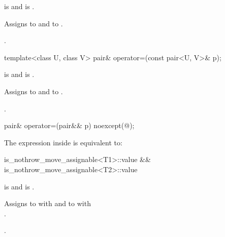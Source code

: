\begin{itemdescr}
\pnum
\requires {} is 
and  is .

\pnum
\effects Assigns  to  and  to .

\pnum
\returns {}.
\end{itemdescr}

\begin{itemdecl}
template<class U, class V> pair& operator=(const pair<U, V>& p);
\end{itemdecl}

\begin{itemdescr}
\pnum
\requires {} is 
and  is .

\pnum
\effects Assigns  to  and  to .

\pnum
\returns {}.
\end{itemdescr}

\begin{itemdecl}
pair& operator=(pair&& p) noexcept(@\seebelow@);
\end{itemdecl}

\begin{itemdescr}
\pnum
\remarks The expression inside  is equivalent to:

\begin{codeblock}
is_nothrow_move_assignable<T1>::value &&
is_nothrow_move_assignable<T2>::value
\end{codeblock}

\pnum
\requires {} is 
and  is .

\pnum
\effects
Assigns to  with 
and to  with\\ .

\pnum
\returns {}.
\end{itemdescr}

